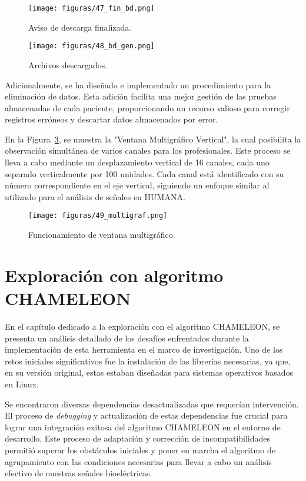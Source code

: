 \begin{figure}[H]
    \centering
    \texttt{[image: figuras/47\_fin\_bd.png]}
    \caption{Aviso de descarga finalizada.}
    \label{fig: fin_bd}
\end{figure}
\begin{figure}[H]
    \centering
    \texttt{[image: figuras/48\_bd\_gen.png]}
    \caption{Archivos descargados.}
    \label{fig: gen_bd}
\end{figure}
Adicionalmente, se ha diseñado e implementado un procedimiento para la eliminación de datos. Esta adición facilita una mejor gestión de las pruebas almacenadas de cada paciente, proporcionando un recurso valioso para corregir registros erróneos y descartar datos almacenados por error.

En la Figura~\ref{fig: multi_graf}, se muestra la "Ventana Multigráfico Vertical", la cual posibilita la observación simultánea de varios canales para los profesionales. Este proceso se lleva a cabo mediante un desplazamiento vertical de 16 canales, cada uno separado verticalmente por 100 unidades. Cada canal está identificado con su número correspondiente en el eje vertical, siguiendo un enfoque similar al utilizado para el análisis de señales en HUMANA.

\begin{figure}[H]
    \centering
    \texttt{[image: figuras/49\_multigraf.png]}
    \caption{Funcionamiento de ventana multigráfico.}
    \label{fig: multi_graf}
\end{figure}

\chapter{Exploración con algoritmo CHAMELEON}
En el capítulo dedicado a la exploración con el algoritmo CHAMELEON, se presenta un análisis detallado de los desafíos enfrentados durante la implementación de esta herramienta en el marco de investigación. Uno de los retos iniciales significativos fue la instalación de las librerías necesarias, ya que, en su versión original, estas estaban diseñadas para sistemas operativos basados en Linux.

Se encontraron diversas dependencias desactualizadas que requerían intervención. El proceso de \textit{debugging} y actualización de estas dependencias fue crucial para lograr una integración exitosa del algoritmo CHAMELEON en el entorno de desarrollo. Este proceso de adaptación y corrección de incompatibilidades permitió superar los obstáculos iniciales y poner en marcha el algoritmo de agrupamiento con las condiciones necesarias para llevar a cabo un análisis efectivo de nuestras señales bioeléctricas.

